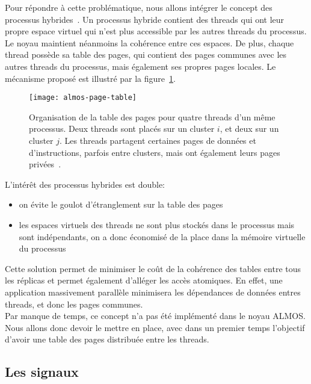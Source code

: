       Pour répondre à cette problématique, nous allons intégrer le concept des
      processus hybrides~\citep{almaless2014universite}. Un processus hybride
      contient des threads qui ont leur propre espace virtuel qui n'est plus
      accessible par les autres threads du processus. Le noyau maintient
      néanmoins la cohérence entre ces espaces. De plus, chaque thread possède
      sa table des pages, qui contient des pages communes avec les autres
      threads du processus, mais également ses propres pages locales. Le
      mécanisme proposé est illustré par la figure~\ref{fig:almos-page-table}.

      \begin{figure}[ht]
        \centering
        \texttt{[image: almos-page-table]}
        \caption{Organisation de la table des pages pour quatre threads d'un
          même processus. Deux threads sont placés sur un cluster $i$, et deux
          sur un cluster $j$. Les threads partagent certaines pages de données
          et d'instructions, parfois entre clusters, mais ont également leurs
          pages privées~\citep{almaless2014universite}.}
        \label{fig:almos-page-table}
      \end{figure}

      L'intérêt des processus hybrides est double:

      \begin{itemize}
        \item on évite le goulot d'étranglement sur la table des pages
        \item les espaces virtuels des threads ne sont plus stockés dans le
          processus mais sont indépendants, on a donc économisé de la place dans
          la mémoire virtuelle du processus
      \end{itemize}

      Cette solution permet de minimiser le coût de la cohérence des tables
      entre tous les réplicas et permet également d'alléger les accès
      atomiques. En effet, une application massivement parallèle minimisera les
      dépendances de données entres threads, et donc les pages communes.\\

      Par manque de temps, ce concept n'a pas été implémenté dans le noyau
      ALMOS. Nous allons donc devoir le mettre en place, avec dans un premier
      temps l'objectif d'avoir une table des pages distribuée entre les
      threads.


    \subsection{Les signaux}

